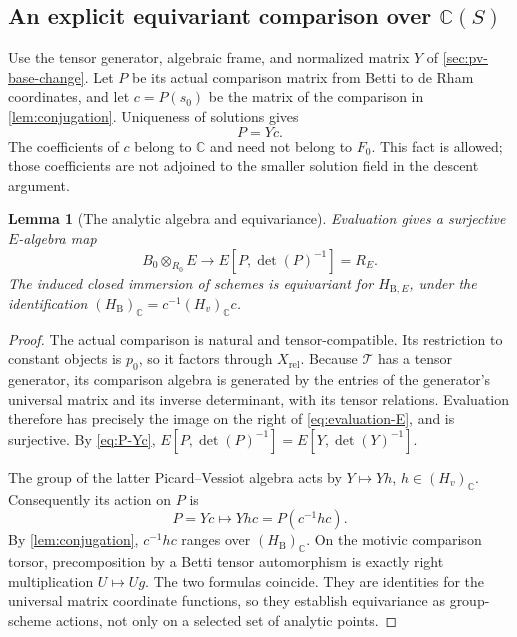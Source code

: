 \documentclass[11pt]{article}
\numberwithin{equation}{section}
\newtheorem{lemma}[lemma]{Lemma}
\theoremstyle{definition}
\theoremstyle{remark}
\newcommand{\C}{\mathbb C}
\newcommand{\Tcal}{\mathcal T}
\newcommand{\B}{\mathrm B}
\begin{document}
\subsection{An explicit equivariant comparison over \texorpdfstring{$\C(S)$}{C(S)}}

Use the tensor generator, algebraic frame, and normalized matrix $Y$ of
\cref{sec:pv-base-change}. Let $P$ be its actual comparison matrix from
Betti to de Rham coordinates, and let $c=P(s_0)$ be the matrix of the
comparison in \cref{lem:conjugation}. Uniqueness of solutions gives
\begin{equation}\label{eq:P-Yc}
 P=Yc.
\end{equation}
The coefficients of $c$ belong to $\C$ and need not belong to $F_0$.
This fact is allowed; those coefficients are not adjoined to the smaller
solution field in the descent argument.

\begin{lemma}[The analytic algebra and equivariance]\label{lem:analytic-torsor}
Evaluation gives a surjective $E$-algebra map
\begin{equation}\label{eq:evaluation-E}
 B_0\otimes_{R_0}E\longrightarrow E[P,\det(P)^{-1}]=R_E.
\end{equation}
The induced closed immersion of schemes is equivariant for
$H_{\B,E}$, under the identification
$(H_\B)_\C=c^{-1}(H_v)_\C c$.
\end{lemma}
\begin{proof}
The actual comparison is natural and tensor-compatible. Its restriction to
constant objects is $p_0$, so it factors through $X_{\mathrm{rel}}$.
Because $\Tcal$ has a tensor generator, its comparison algebra is generated
by the entries of the generator's universal matrix and its inverse
determinant, with its tensor relations. Evaluation therefore has precisely
the image on the right of \eqref{eq:evaluation-E}, and is surjective.
By \eqref{eq:P-Yc}, $E[P,\det(P)^{-1}]=E[Y,\det(Y)^{-1}]$.

The group of the latter Picard--Vessiot algebra acts by $Y\mapsto Yh$,
$h\in(H_v)_\C$. Consequently its action on $P$ is
\[
 P=Yc\longmapsto Yhc=P(c^{-1}hc).
\]
By \cref{lem:conjugation}, $c^{-1}hc$ ranges over $(H_\B)_\C$.
On the motivic comparison torsor, precomposition by a Betti tensor
automorphism is exactly right multiplication $U\mapsto Ug$.
The two formulas coincide. They are identities for the universal matrix
coordinate functions, so they establish equivariance as group-scheme
actions, not only on a selected set of analytic points.
\end{proof}
\end{document}
